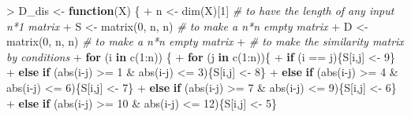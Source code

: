 \documentclass[
]{article}
\newenvironment{Shaded}{\begin{snugshade}}{\end{snugshade}}
\newcommand{\CommentTok}[1]{\textcolor[rgb]{0.56,0.35,0.01}{\textit{#1}}}
\newcommand{\ControlFlowTok}[1]{\textcolor[rgb]{0.13,0.29,0.53}{\textbf{#1}}}
\newcommand{\DecValTok}[1]{\textcolor[rgb]{0.00,0.00,0.81}{#1}}
\newcommand{\FunctionTok}[1]{\textcolor[rgb]{0.00,0.00,0.00}{#1}}
\newcommand{\NormalTok}[1]{#1}
\newcommand{\OtherTok}[1]{\textcolor[rgb]{0.56,0.35,0.01}{#1}}
\newcommand{\SpecialCharTok}[1]{\textcolor[rgb]{0.00,0.00,0.00}{#1}}
\begin{document}
\begin{Shaded}
\begin{Highlighting}[]
\SpecialCharTok{\textgreater{}}\NormalTok{ D\_dis }\OtherTok{\textless{}{-}} \ControlFlowTok{function}\NormalTok{(X) \{}
\SpecialCharTok{+}\NormalTok{   n }\OtherTok{\textless{}{-}} \FunctionTok{dim}\NormalTok{(X)[}\DecValTok{1}\NormalTok{] }\CommentTok{\# to have the length of any input n*1 matrix}
\SpecialCharTok{+}\NormalTok{   S }\OtherTok{\textless{}{-}} \FunctionTok{matrix}\NormalTok{(}\DecValTok{0}\NormalTok{, n, n) }\CommentTok{\# to make a n*n empty matrix }
\SpecialCharTok{+}\NormalTok{   D }\OtherTok{\textless{}{-}} \FunctionTok{matrix}\NormalTok{(}\DecValTok{0}\NormalTok{, n, n) }\CommentTok{\# to make a n*n empty matrix }
\SpecialCharTok{+}   \CommentTok{\# to make the similarity matrix by conditions}
\SpecialCharTok{+}   \ControlFlowTok{for}\NormalTok{ (i }\ControlFlowTok{in} \FunctionTok{c}\NormalTok{(}\DecValTok{1}\SpecialCharTok{:}\NormalTok{n)) \{}
\SpecialCharTok{+}     \ControlFlowTok{for}\NormalTok{ (j }\ControlFlowTok{in} \FunctionTok{c}\NormalTok{(}\DecValTok{1}\SpecialCharTok{:}\NormalTok{n))\{}
\SpecialCharTok{+}       \ControlFlowTok{if}\NormalTok{ (i }\SpecialCharTok{==}\NormalTok{ j)\{S[i,j] }\OtherTok{\textless{}{-}} \DecValTok{9}\NormalTok{\}}
\SpecialCharTok{+}       \ControlFlowTok{else} \ControlFlowTok{if}\NormalTok{ (}\FunctionTok{abs}\NormalTok{(i}\SpecialCharTok{{-}}\NormalTok{j) }\SpecialCharTok{\textgreater{}=} \DecValTok{1} \SpecialCharTok{\&} \FunctionTok{abs}\NormalTok{(i}\SpecialCharTok{{-}}\NormalTok{j) }\SpecialCharTok{\textless{}=} \DecValTok{3}\NormalTok{)\{S[i,j] }\OtherTok{\textless{}{-}} \DecValTok{8}\NormalTok{\}}
\SpecialCharTok{+}       \ControlFlowTok{else} \ControlFlowTok{if}\NormalTok{ (}\FunctionTok{abs}\NormalTok{(i}\SpecialCharTok{{-}}\NormalTok{j) }\SpecialCharTok{\textgreater{}=} \DecValTok{4} \SpecialCharTok{\&} \FunctionTok{abs}\NormalTok{(i}\SpecialCharTok{{-}}\NormalTok{j) }\SpecialCharTok{\textless{}=} \DecValTok{6}\NormalTok{)\{S[i,j] }\OtherTok{\textless{}{-}} \DecValTok{7}\NormalTok{\}}
\SpecialCharTok{+}       \ControlFlowTok{else} \ControlFlowTok{if}\NormalTok{ (}\FunctionTok{abs}\NormalTok{(i}\SpecialCharTok{{-}}\NormalTok{j) }\SpecialCharTok{\textgreater{}=} \DecValTok{7} \SpecialCharTok{\&} \FunctionTok{abs}\NormalTok{(i}\SpecialCharTok{{-}}\NormalTok{j) }\SpecialCharTok{\textless{}=} \DecValTok{9}\NormalTok{)\{S[i,j] }\OtherTok{\textless{}{-}} \DecValTok{6}\NormalTok{\}}
\SpecialCharTok{+}       \ControlFlowTok{else} \ControlFlowTok{if}\NormalTok{ (}\FunctionTok{abs}\NormalTok{(i}\SpecialCharTok{{-}}\NormalTok{j) }\SpecialCharTok{\textgreater{}=} \DecValTok{10} \SpecialCharTok{\&} \FunctionTok{abs}\NormalTok{(i}\SpecialCharTok{{-}}\NormalTok{j) }\SpecialCharTok{\textless{}=} \DecValTok{12}\NormalTok{)\{S[i,j] }\OtherTok{\textless{}{-}} \DecValTok{5}\NormalTok{\}}

\end{Highlighting}
\end{Shaded}
\end{document}
